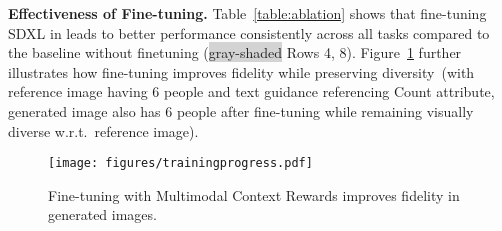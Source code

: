 
\textbf{Effectiveness of Fine-tuning.} Table~\ref{table:ablation} shows that fine-tuning SDXL in \method leads to better performance consistently across all tasks compared to the baseline without finetuning (\colorbox{lightgray}{gray-shaded} Rows 4, 8). Figure~\ref{fig:training_progress} further illustrates how fine-tuning improves fidelity while preserving diversity~(with reference image having 6 people and text guidance referencing Count attribute, generated image also has 6 people after fine-tuning while remaining visually diverse w.r.t.~reference image).

\begin{figure}[!t]
    \centering
    \texttt{[image: figures/trainingprogress.pdf]}
    \vspace{-6mm}
    \caption{Fine-tuning with Multimodal Context Rewards improves fidelity in generated images.}
    \vspace{-5mm}
    \label{fig:training_progress}
\end{figure}
% 